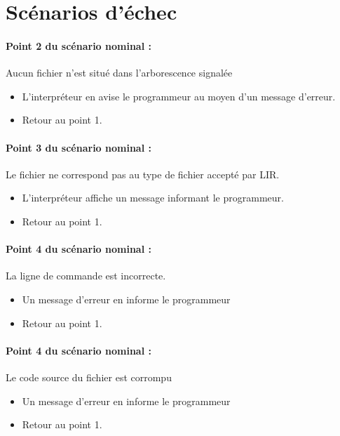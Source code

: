 \documentclass[12pt,a4paper]{article}
\begin{document}
	\section{Scénarios d'échec}
	
	\paragraph{Point 2 du scénario nominal :} Aucun fichier n'est situé dans l'arborescence signalée 
	\begin{itemize}
		\item L'interpréteur en avise le programmeur au moyen d'un message d'erreur.
		\item Retour au point 1.
	\end{itemize}
	
	\paragraph{Point 3 du scénario nominal :} Le fichier ne correspond pas au type de fichier accepté par LIR.
	\begin{itemize}
		\item L'interpréteur affiche un message informant le programmeur.
		\item Retour au point 1.
	\end{itemize}
	
	\paragraph{Point 4 du scénario nominal :} La ligne de commande est incorrecte.
	\begin{itemize}
		\item Un message d'erreur en informe le programmeur
		\item Retour au point 1.
	\end{itemize}

	\paragraph{Point 4 du scénario nominal :} Le code source du fichier est corrompu
	\begin{itemize}
		\item Un message d'erreur en informe le programmeur
		\item Retour au point 1.
	\end{itemize}
	
	
\end{document}
